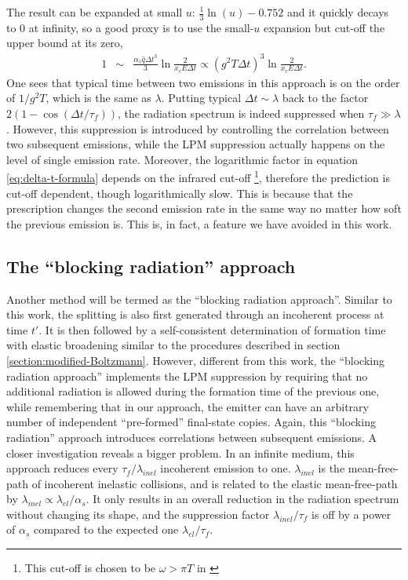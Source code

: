 \documentclass[aps, prc, reprint, amsmath, groupedaddress, nofootinbib]{revtex4-1}
\begin{document}
The result can be expanded at small $u$: $\frac{1}{3}\ln(u)-0.752$ and it quickly decays to $0$ at infinity, so a good proxy is to use the small-$u$ expansion but cut-off the upper bound at its zero,
\begin{eqnarray}
1 &\sim&  \frac{\alpha_s\hat{q}\Delta t^3}{3}\ln\frac{2}{ x_c E \Delta t } \propto (g^2 T \Delta t)^3 \ln\frac{2}{ x_c E \Delta t }.
\label{eq:delta-t-formula}
\end{eqnarray}
One sees that typical time between two emissions in this approach is on the order of $1/g^2T$, which is the same as $\lambda$.
Putting typical $\Delta t \sim \lambda$ back to the factor $2(1-\cos(\Delta t/\tau_f))$, the radiation spectrum is indeed suppressed when $\tau_f \gg \lambda$.
However, this suppression is introduced by controlling the correlation between two subsequent emissions, while the LPM suppression actually happens on the level of single emission rate.
Moreover, the logarithmic factor in equation \ref{eq:delta-t-formula} depends on the infrared cut-off \footnote{This cut-off is chosen to be $\omega > \pi T$ in \cite{Cao:2013ita}}, therefore the prediction is cut-off dependent, though logarithmically slow.
This is because that the prescription changes the second emission rate in the same way no matter how soft the previous emission is.
This is, in fact, a feature we have avoided in this work.

\subsection{The ``blocking radiation'' approach}
Another method \cite{ColemanSmith:2012vr} will be termed as the ``blocking radiation approach''.
Similar to this work, the splitting is also first generated through an incoherent process at time $t'$. 
It is then followed by a self-consistent determination of formation time with elastic broadening similar to the procedures described in section \ref{section:modified-Boltzmann}.
However, different from this work, the ``blocking radiation approach'' implements the LPM suppression by requiring that no additional radiation is allowed during the formation time of the previous one, while remembering that in our approach, the emitter can have an arbitrary number of independent ``pre-formed'' final-state copies.
Again, this ``blocking radiation'' approach introduces correlations between subsequent emissions.
A closer investigation reveals a bigger problem.
In an infinite medium, this approach reduces every $\tau_f/\lambda_{inel}$ incoherent emission to one. 
$\lambda_{inel}$ is the mean-free-path of incoherent inelastic collisions, and is related to the elastic mean-free-path by $\lambda_{inel}\propto \lambda_{el}/\alpha_s$. 
It only results in an overall reduction in the radiation spectrum without changing its shape, and the suppression factor $\lambda_{inel}/\tau_f$ is off by a power of $\alpha_s$ compared to the expected one $\lambda_{el}/\tau_f$.
\end{document}
